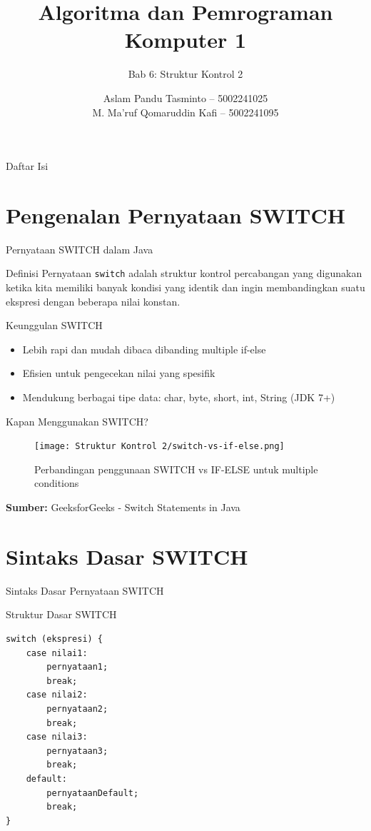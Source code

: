 \documentclass{beamer}
\title{Algoritma dan Pemrograman Komputer 1}
\subtitle{Bab 6: Struktur Kontrol 2}
\author{Aslam Pandu Tasminto -- 5002241025 \\ M. Ma'ruf Qomaruddin Kafi -- 5002241095}
\institute{Departemen Matematika \\ Fakultas Sains dan Analitika Data \\ Institut Teknologi Sepuluh Nopember}
\begin{document}
\maketitle

\begin{frame}{Daftar Isi}
  \tableofcontents
\end{frame}

\section{Pengenalan Pernyataan SWITCH}
\begin{frame}{Pernyataan SWITCH dalam Java}
  \begin{block}{Definisi}
    Pernyataan \texttt{switch} adalah struktur kontrol percabangan yang digunakan ketika kita memiliki banyak kondisi yang identik dan ingin membandingkan suatu ekspresi dengan beberapa nilai konstan.
  \end{block}
  \begin{block}{Keunggulan SWITCH}
    \begin{itemize}
      \item Lebih rapi dan mudah dibaca dibanding multiple if-else
      \item Efisien untuk pengecekan nilai yang spesifik
      \item Mendukung berbagai tipe data: char, byte, short, int, String (JDK 7+)
    \end{itemize}
  \end{block}
\end{frame}

\begin{frame}[fragile]{Kapan Menggunakan SWITCH?}
  \begin{figure}[h]
    \centering
    \texttt{[image: Struktur Kontrol 2/switch-vs-if-else.png]}
    \caption{Perbandingan penggunaan SWITCH vs IF-ELSE untuk multiple conditions}
    \label{fig:switch-vs-if}
  \end{figure}
  \textbf{Sumber: }GeeksforGeeks - Switch Statements in Java
\end{frame}

\section{Sintaks Dasar SWITCH}
\begin{frame}[fragile]{Sintaks Dasar Pernyataan SWITCH}
  \begin{block}{Struktur Dasar SWITCH}
    \begin{lstlisting}
switch (ekspresi) {
    case nilai1:
        pernyataan1;
        break;
    case nilai2:
        pernyataan2;
        break;
    case nilai3:
        pernyataan3;
        break;
    default:
        pernyataanDefault;
        break;
}
    \end{lstlisting}
  \end{block}
\end{frame}
\end{document}
